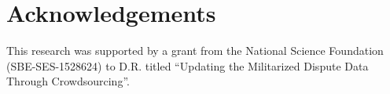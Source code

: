 \section{Acknowledgements}
This research was supported by a grant from the National Science Foundation (SBE-SES-1528624) to D.R. titled ``Updating the Militarized Dispute Data Through Crowdsourcing''.